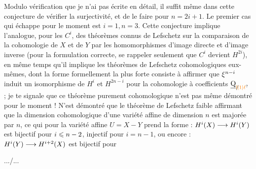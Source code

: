 Modulo vérification que je n'ai pas écrite en détail, il suffit
même dans cette conjecture de vérifier la surjectivité, et de le faire pour
$n=2i+1$. Le premier cas qui échappe pour le moment est $i=1,n=3$.
Cette conjecture implique l'analogue, pour les $C^i$, des théorèmes connus
de Lefschetz sur la comparaison de la cohomologie de $X$ et de $Y$ par les
homomorphismes d'image directe et d'image inverse (pour la formulation
correcte, se rappeler seulement que $C^i$ devient $H^{2i}$), en même temps
qu'il implique les théorèmes de Lefschetz cohomologiques eux-mêmes, dont
la forme formellement la plus forte consiste à affirmer que $\xi^{n-i}$ induit
un isomorphisme de $H^i$ et $H^{2n-i}$ pour la cohomologie à coefficients $\underline{\mathrm Q}_{\rlap{$\scriptstyle\handwritten{/}$}\unsure{\mathrm{l}|1|\ell}}$ ;
je te signale que ce théorème purement cohomologique n'est pas même démontré
pour le moment ! N'est démontré que le théorème de Lefschetz
\textquotedbl{}faible\textquotedbl{} affirmant que la dimension cohomologique d'une variété affine
de dimension $n$ est majorée par $n$, ce qui pour la variété affine
$U=X-Y$ prend la forme : $H^i(X)\longrightarrow H^i(Y)$ est bijectif pour $i\leqslant n-2$,
injectif pour $i=n-1$, ou encore : $H^i(Y)\longrightarrow H^{i+2}(X)$ est bijectif pour

\hfill .../...
